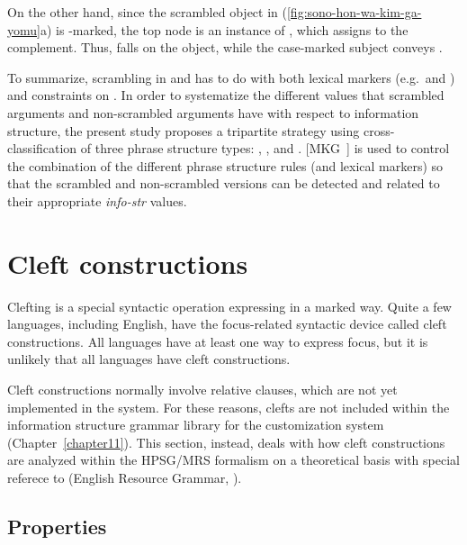 \noindent On the other hand, since the scrambled object in
(\ref{fig:sono-hon-wa-kim-ga-yomu}a) is {\wa}-marked, the top node is
an instance of , which assigns
 to the complement. Thus,  falls on the
object, while the case-marked subject conveys .


To summarize, scrambling in
 and  has to do with both lexical markers
(e.g.\ \wa and \nun) and constraints on
. In order to systematize the
different values that scrambled arguments and non-scrambled arguments
have with respect to information structure, the present study proposes
a tripartite strategy using cross-classification of three phrase
structure types: , , and
. \mbox{[MKG ]} is used to control
the combination of the different phrase structure rules (and lexical
markers) so that the scrambled and non-scrambled versions can be
detected and related to their appropriate \textit{info-str}
values.



\section{Cleft constructions}
\label{10:sec:clefts}


Clefting is a special syntactic operation expressing  in a marked
way. Quite a few languages, including English, have the
focus-related syntactic device called cleft constructions.  All
languages have at least one way to express focus, but it is unlikely
that all languages have cleft constructions.


Cleft constructions normally involve relative clauses, which are not yet implemented in the \lingo {} system.  For these reasons, clefts are not included within
the information structure grammar library for the customization system
(Chapter~\ref{chapter11}).  This section, instead, deals with how
cleft constructions are analyzed within the HPSG/MRS formalism on a
theoretical basis with special referece to  (English Resource
Grammar, \citealt{flickinger:00}).



\subsection{Properties}
\label{10:sssec:clefts:properties}



